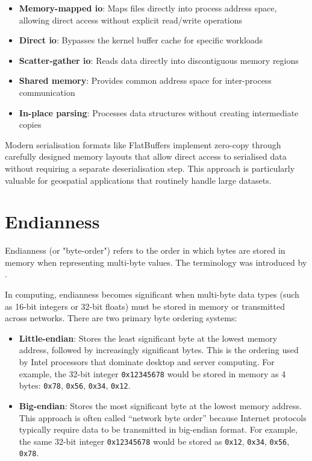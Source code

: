 \begin{itemize}
  \item \textbf{Memory-mapped \ac{io}}: Maps files directly into process address space, allowing direct access without explicit read/write operations
  \item \textbf{Direct \ac{io}}: Bypasses the kernel buffer cache for specific workloads
  \item \textbf{Scatter-gather \ac{io}}: Reads data directly into discontiguous memory regions
  \item \textbf{Shared memory}: Provides common address space for inter-process communication
  \item \textbf{In-place parsing}: Processes data structures without creating intermediate copies
\end{itemize}

Modern serialisation formats like FlatBuffers implement zero-copy through carefully designed memory layouts that allow direct access to serialised data without requiring a separate deserialisation step. This approach is particularly valuable for geospatial applications that routinely handle large datasets.
\section{Endianness}
\label{tb:endianness}
Endianness (or "byte-order") refers to the order in which bytes are stored in memory when representing multi-byte values. The terminology was introduced by \citet{danny_cohen_1981}.

In computing, endianness becomes significant when multi-byte data types (such as 16-bit integers or 32-bit floats) must be stored in memory or transmitted across networks. There are two primary byte ordering systems:

\begin{itemize}
  \item \textbf{Little-endian}: Stores the least significant byte at the lowest memory address, followed by increasingly significant bytes. This is the ordering used by Intel processors that dominate desktop and server computing. For example, the 32-bit integer \texttt{0x12345678} would be stored in memory as 4 bytes: \texttt{0x78}, \texttt{0x56}, \texttt{0x34}, \texttt{0x12}.

  \item \textbf{Big-endian}: Stores the most significant byte at the lowest memory address. This approach is often called ``network byte order'' because Internet protocols typically require data to be transmitted in big-endian format. For example, the same 32-bit integer \texttt{0x12345678} would be stored as \texttt{0x12}, \texttt{0x34}, \texttt{0x56}, \texttt{0x78}.
\end{itemize}

